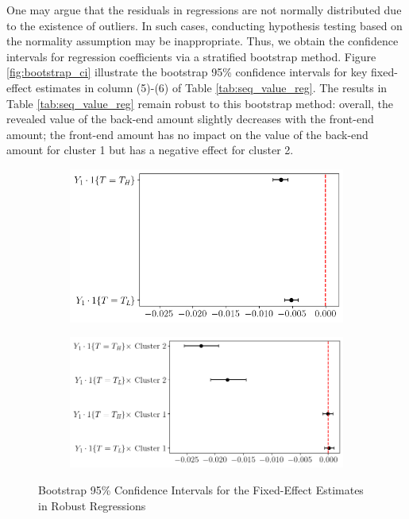 \documentclass[
  12pt,
]{article}
\begin{document}
One may argue that the residuals in regressions are not normally
distributed due to the existence of outliers. In such cases, conducting
hypothesis testing based on the normality assumption may be
inappropriate. Thus, we obtain the confidence intervals for regression
coefficients via a stratified bootstrap method. Figure
\ref{fig:bootstrap_ci} illustrate the bootstrap 95\% confidence
intervals for key fixed-effect estimates in column (5)-(6) of Table
\ref{tab:seq_value_reg}. The results in Table \ref{tab:seq_value_reg}
remain robust to this bootstrap method: overall, the revealed value of
the back-end amount slightly decreases with the front-end amount; the
front-end amount has no impact on the value of the back-end amount for
cluster 1 but has a negative effect for cluster 2.

\begin{figure} 
\centering
\begin{subfigure}{0.85\textwidth}
  \hfill
  \includegraphics[width=0.85\linewidth]{figures/bootstrap_ci_baseline.png}
\end{subfigure}
\begin{subfigure}{0.85\textwidth} 
  \hfill
  \includegraphics[width=\linewidth]{figures/bootstrap_ci_label.png} 
\end{subfigure}
\caption{Bootstrap 95\% Confidence Intervals for the Fixed-Effect Estimates in Robust Regressions}

\end{figure}
\end{document}
